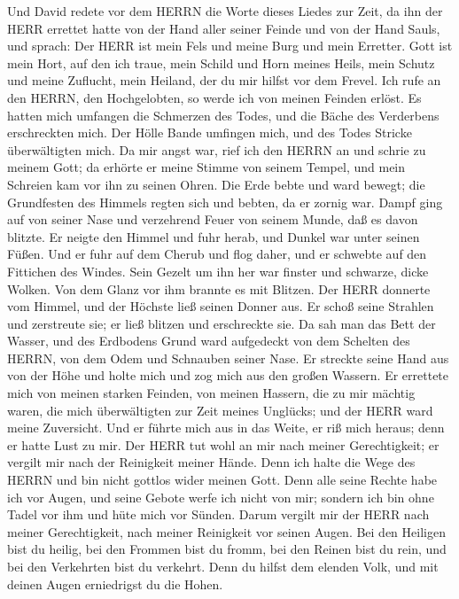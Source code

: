 Und David redete vor dem HERRN die Worte dieses Liedes zur
Zeit, da ihn der HERR errettet hatte von der Hand aller seiner Feinde
und von der Hand Sauls, und sprach:  Der HERR ist mein Fels
und meine Burg und mein Erretter.  Gott ist mein Hort, auf
den ich traue, mein Schild und Horn meines Heils, mein Schutz und meine
Zuflucht, mein Heiland, der du mir hilfst vor dem Frevel. 
Ich rufe an den HERRN, den Hochgelobten, so werde ich von meinen Feinden
erlöst.  Es hatten mich umfangen die Schmerzen des Todes,
und die Bäche des Verderbens erschreckten mich.  Der Hölle
Bande umfingen mich, und des Todes Stricke überwältigten mich.
 Da mir angst war, rief ich den HERRN an und schrie zu
meinem Gott; da erhörte er meine Stimme von seinem Tempel, und mein
Schreien kam vor ihn zu seinen Ohren.  Die Erde bebte und
ward bewegt; die Grundfesten des Himmels regten sich und bebten, da er
zornig war.  Dampf ging auf von seiner Nase und verzehrend
Feuer von seinem Munde, daß es davon blitzte.  Er neigte
den Himmel und fuhr herab, und Dunkel war unter seinen Füßen.
 Und er fuhr auf dem Cherub und flog daher, und er schwebte
auf den Fittichen des Windes.  Sein Gezelt um ihn her war
finster und schwarze, dicke Wolken.  Von dem Glanz vor ihm
brannte es mit Blitzen.  Der HERR donnerte vom Himmel, und
der Höchste ließ seinen Donner aus.  Er schoß seine
Strahlen und zerstreute sie; er ließ blitzen und erschreckte sie.
 Da sah man das Bett der Wasser, und des Erdbodens Grund
ward aufgedeckt von dem Schelten des HERRN, von dem Odem und Schnauben
seiner Nase.  Er streckte seine Hand aus von der Höhe und
holte mich und zog mich aus den großen Wassern.  Er
errettete mich von meinen starken Feinden, von meinen Hassern, die zu
mir mächtig waren,  die mich überwältigten zur Zeit meines
Unglücks; und der HERR ward meine Zuversicht.  Und er
führte mich aus in das Weite, er riß mich heraus; denn er hatte Lust zu
mir.  Der HERR tut wohl an mir nach meiner Gerechtigkeit;
er vergilt mir nach der Reinigkeit meiner Hände.  Denn ich
halte die Wege des HERRN und bin nicht gottlos wider meinen Gott.
 Denn alle seine Rechte habe ich vor Augen, und seine
Gebote werfe ich nicht von mir;  sondern ich bin ohne Tadel
vor ihm und hüte mich vor Sünden.  Darum vergilt mir der
HERR nach meiner Gerechtigkeit, nach meiner Reinigkeit vor seinen Augen.
 Bei den Heiligen bist du heilig, bei den Frommen bist du
fromm,  bei den Reinen bist du rein, und bei den Verkehrten
bist du verkehrt.  Denn du hilfst dem elenden Volk, und mit
deinen Augen erniedrigst du die Hohen.

